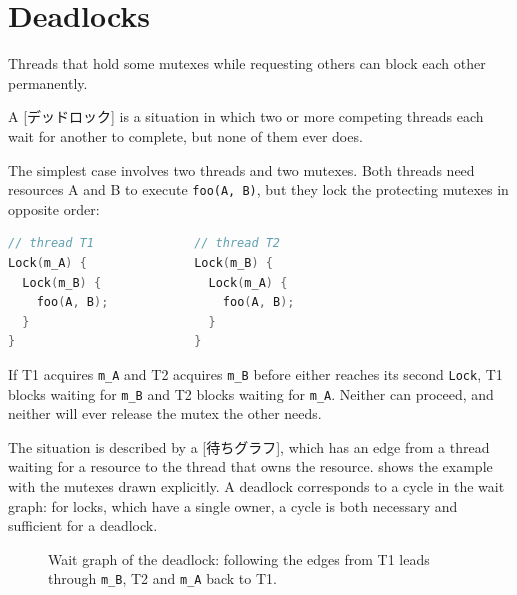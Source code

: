 \documentclass[../main.tex]{subfiles}
\begin{document}
\section{Deadlocks}
\label{sec:l03-deadlock}

Threads that hold some mutexes while requesting others can block each other
permanently.

\begin{definition}[Deadlock]
  A [デッドロック] is a situation in which two or more
  competing threads each wait for another to complete, but none of them
  ever does.
\end{definition}

The simplest case involves two threads and two mutexes.  Both threads need resources A and B to execute
\texttt{foo(A, B)}, but they lock the protecting mutexes in opposite
order:
\begin{lstlisting}[language=C, numbers=none]
// thread T1              // thread T2
Lock(m_A) {               Lock(m_B) {
  Lock(m_B) {               Lock(m_A) {
    foo(A, B);                foo(A, B);
  }                         }
}                         }
\end{lstlisting}
If T1 acquires \texttt{m\_A} and T2 acquires \texttt{m\_B} before either
reaches its second \texttt{Lock}, T1 blocks waiting for \texttt{m\_B} and T2
blocks waiting for \texttt{m\_A}.  Neither can proceed, and neither will ever
release the mutex the other needs.

The situation is described by a [待ちグラフ], which has an
edge from a thread waiting for a resource to the thread that owns the
resource.  \Cref{fig:l03-wait-graph} shows the example with the mutexes drawn
explicitly.  A deadlock corresponds to a cycle in the wait graph: for locks,
which have a single owner, a cycle is both necessary and sufficient for a
deadlock.

\begin{figure}[htbp]
  \centering
  
  \caption{Wait graph of the deadlock: following the edges from T1 leads
    through \texttt{m\_B}, T2 and \texttt{m\_A} back to T1.}
  \label{fig:l03-wait-graph}
\end{figure}
\end{document}
